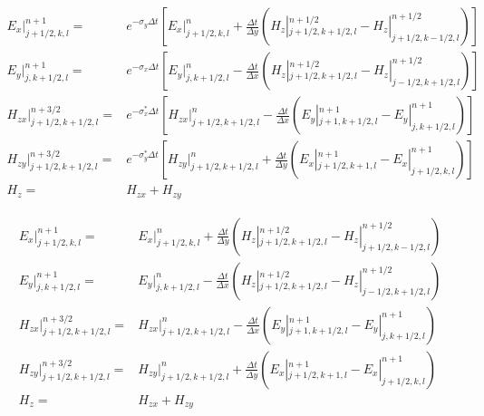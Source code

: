 %
\begin{subequations}
\begin{align}
E_x|^{n+1}_{j+1/2,k,l} = & e^{-\sigma_y\Delta t} \left[ E_x|^{n}_{j+1/2,k,l} + \frac{\Delta t}{\Delta y} \left(H_z|^{n+1/2}_{j+1/2,k+1/2,l}-H_z|^{n+1/2}_{j+1/2,k-1/2,l}\right) \right] \\
%
E_y|^{n+1}_{j,k+1/2,l} = & e^{-\sigma_x\Delta t} \left[ E_y|^{n}_{j,k+1/2,l} - \frac{\Delta t}{\Delta x}  \left(H_z|^{n+1/2}_{j+1/2,k+1/2,l}-H_z|^{n+1/2}_{j-1/2,k+1/2,l}\right) \right] \\
%
H_{zx}|^{n+3/2}_{j+1/2,k+1/2,l} = & e^{-\sigma^*_x\Delta t} \left[ H_{zx}|^{n}_{j+1/2,k+1/2,l} - \frac{\Delta t}{\Delta x}  \left(E_y|^{n+1}_{j+1,k+1/2,l}-E_y|^{n+1}_{j,k+1/2,l}\right) \right] \\
%
H_{zy}|^{n+3/2}_{j+1/2,k+1/2,l} = & e^{-\sigma^*_y\Delta t} \left[ H_{zy}|^{n}_{j+1/2,k+1/2,l} + \frac{\Delta t}{\Delta y}  \left(E_x|^{n+1}_{j+1/2,k+1,l}-E_x|^{n+1}_{j+1/2,k,l}\right) \right] \\
%
H_z = & H_{zx}+H_{zy}
\end{align}
\end{subequations}

%
\begin{subequations}
\begin{align}
E_x|^{n+1}_{j+1/2,k,l} = & E_x|^{n}_{j+1/2,k,l} + \frac{\Delta t}{\Delta y} \left(H_z|^{n+1/2}_{j+1/2,k+1/2,l}-H_z|^{n+1/2}_{j+1/2,k-1/2,l}\right) \\
%
E_y|^{n+1}_{j,k+1/2,l} = & E_y|^{n}_{j,k+1/2,l} - \frac{\Delta t}{\Delta x} \left(H_z|^{n+1/2}_{j+1/2,k+1/2,l}-H_z|^{n+1/2}_{j-1/2,k+1/2,l}\right) \\
%
H_{zx}|^{n+3/2}_{j+1/2,k+1/2,l} = & H_{zx}|^{n}_{j+1/2,k+1/2,l} - \frac{\Delta t}{\Delta x} \left(E_y|^{n+1}_{j+1,k+1/2,l}-E_y|^{n+1}_{j,k+1/2,l}\right) \\
%
H_{zy}|^{n+3/2}_{j+1/2,k+1/2,l} = & H_{zy}|^{n}_{j+1/2,k+1/2,l} + \frac{\Delta t}{\Delta y} \left(E_x|^{n+1}_{j+1/2,k+1,l}-E_x|^{n+1}_{j+1/2,k,l}\right) \\
%
H_z = & H_{zx}+H_{zy}
\end{align}
\end{subequations}
